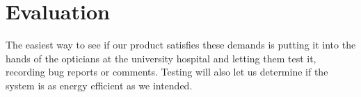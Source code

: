 \documentclass[12pt,a4paper,notitlepage]{report}
\begin{document}
\section{Evaluation} %
The easiest way to see if our product satisfies these demands is putting it into the hands of the opticians at the university hospital and letting them test it, recording bug reports or comments. Testing will also let us determine if the system is as energy efficient as we intended.



\end{document}
